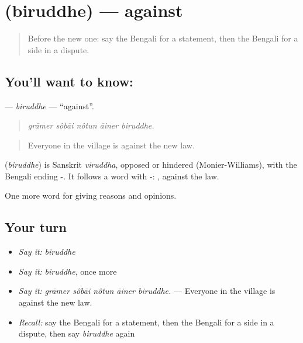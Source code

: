 \section[\texorpdfstring{\bn{বিরুদ্ধে} (biruddhe)}{বিরুদ্ধে (biruddhe)}]{ (biruddhe) — against}

\label{lesson:BN-C333-biruddhe}



\begin{quote}
Before the new one: say the Bengali for a statement, then the Bengali for a side in a dispute.
\end{quote}

\subsection*{You'll want to know: }
\textbf{} — \emph{biruddhe} — \textquotedblleft{}against\textquotedblright{}.

\begin{quote}
    
\end{quote}

\begin{quote}
\emph{grāmer sôbāi nôtun āiner biruddhe.}
\end{quote}

\begin{quote}
Everyone in the village is against the new law.
\end{quote}

\begin{cousinweb}
\textbf{} (\emph{biruddhe}) is Sanskrit \emph{viruddha}, opposed or hindered (Monier-Williams), with the Bengali ending -. It follows a word with -:  , against the law.
\end{cousinweb}

\begin{grammarlens}[title={What you've built}]
One more word for giving reasons and opinions.
\end{grammarlens}

\subsection*{Your turn}
\begin{itemize}
\raggedright
  \item \emph{Say it:} \emph{biruddhe}
  \item \emph{Say it:} \emph{biruddhe}, once more
  \item \emph{Say it:} \emph{grāmer sôbāi nôtun āiner biruddhe.} — Everyone in the village is against the new law.
  \item \emph{Recall:} say the Bengali for a statement, then the Bengali for a side in a dispute, then say \emph{biruddhe} again
\end{itemize}

